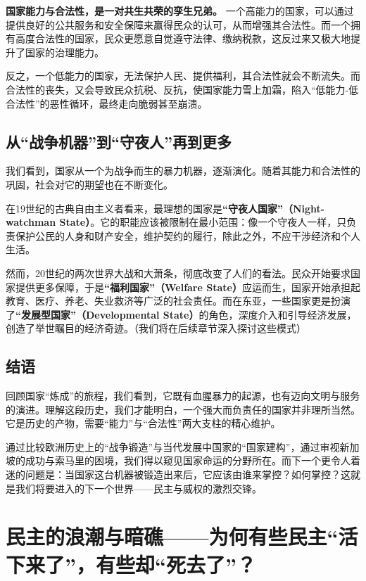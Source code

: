 \documentclass[a5paper, 11pt, openany]{ctexbook}
\begin{document}
\textbf{国家能力与合法性，是一对共生共荣的孪生兄弟。} 一个高能力的国家，可以通过提供良好的公共服务和安全保障来赢得民众的认可，从而增强其合法性。而一个拥有高度合法性的国家，民众更愿意自觉遵守法律、缴纳税款，这反过来又极大地提升了国家的治理能力。

反之，一个低能力的国家，无法保护人民、提供福利，其合法性就会不断流失。而合法性的丧失，又会导致民众抗税、反抗，使国家能力雪上加霜，陷入“低能力-低合法性”的恶性循环，最终走向脆弱甚至崩溃。

\section{从“战争机器”到“守夜人”再到更多}

我们看到，国家从一个为战争而生的暴力机器，逐渐演化。随着其能力和合法性的巩固，社会对它的期望也在不断变化。

在19世纪的古典自由主义者看来，最理想的国家是\textbf{“守夜人国家”（Night-watchman State）}。它的职能应该被限制在最小范围：像一个守夜人一样，只负责保护公民的人身和财产安全，维护契约的履行，除此之外，不应干涉经济和个人生活。

然而，20世纪的两次世界大战和大萧条，彻底改变了人们的看法。民众开始要求国家提供更多保障，于是\textbf{“福利国家”（Welfare State）}应运而生，国家开始承担起教育、医疗、养老、失业救济等广泛的社会责任。而在东亚，一些国家更是扮演了\textbf{“发展型国家”（Developmental State）}的角色，深度介入和引导经济发展，创造了举世瞩目的经济奇迹。（我们将在后续章节深入探讨这些模式）

\section*{结语}

回顾国家“炼成”的旅程，我们看到，它既有血腥暴力的起源，也有迈向文明与服务的演进。理解这段历史，我们才能明白，一个强大而负责任的国家并非理所当然。它是历史的产物，需要“能力”与“合法性”两大支柱的精心维护。

通过比较欧洲历史上的“战争锻造”与当代发展中国家的“国家建构”，通过审视新加坡的成功与索马里的困境，我们得以窥见国家命运的分野所在。而下一个更令人着迷的问题是：当国家这台机器被锻造出来后，它应该由谁来掌控？如何掌控？这就是我们将要进入的下一个世界——民主与威权的激烈交锋。

\chapter{民主的浪潮与暗礁——为何有些民主“活下来了”，有些却“死去了”？}
\end{document}
